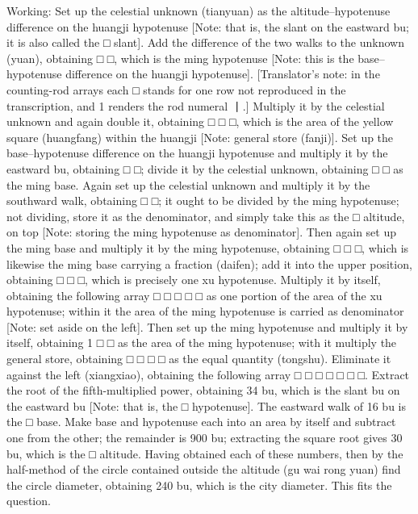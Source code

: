 \documentclass[11pt]{article}
\newenvironment{uniten}{\par\small\color{black!85}}{\par\medskip}
\begin{document}
\begin{uniten}Working: Set up the celestial unknown (tianyuan) as the altitude–hypotenuse difference on the huangji hypotenuse [Note: that is, the slant on the eastward bu; it is also called the □ slant]. Add the difference of the two walks to the unknown (yuan), obtaining □ □, which is the ming hypotenuse [Note: this is the base–hypotenuse difference on the huangji hypotenuse]. [Translator's note: in the counting-rod arrays each □ stands for one row not reproduced in the transcription, and 1 renders the rod numeral 丨.] Multiply it by the celestial unknown and again double it, obtaining □ □ □, which is the area of the yellow square (huangfang) within the huangji [Note: general store (fanji)]. Set up the base–hypotenuse difference on the huangji hypotenuse and multiply it by the eastward bu, obtaining □ □; divide it by the celestial unknown, obtaining □ □ as the ming base. Again set up the celestial unknown and multiply it by the southward walk, obtaining □ □; it ought to be divided by the ming hypotenuse; not dividing, store it as the denominator, and simply take this as the □ altitude, on top [Note: storing the ming hypotenuse as denominator]. Then again set up the ming base and multiply it by the ming hypotenuse, obtaining □ □ □, which is likewise the ming base carrying a fraction (daifen); add it into the upper position, obtaining □ □ □, which is precisely one xu hypotenuse. Multiply it by itself, obtaining the following array □ □ □ □ □ as one portion of the area of the xu hypotenuse; within it the area of the ming hypotenuse is carried as denominator [Note: set aside on the left]. Then set up the ming hypotenuse and multiply it by itself, obtaining 1 □ □ as the area of the ming hypotenuse; with it multiply the general store, obtaining □ □ □ □ as the equal quantity (tongshu). Eliminate it against the left (xiangxiao), obtaining the following array □ □ □ □ □ □ □. Extract the root of the fifth-multiplied power, obtaining 34 bu, which is the slant bu on the eastward bu [Note: that is, the □ hypotenuse]. The eastward walk of 16 bu is the □ base. Make base and hypotenuse each into an area by itself and subtract one from the other; the remainder is 900 bu; extracting the square root gives 30 bu, which is the □ altitude. Having obtained each of these numbers, then by the half-method of the circle contained outside the altitude (gu wai rong yuan) find the circle diameter, obtaining 240 bu, which is the city diameter. This fits the question.\end{uniten}
\end{document}
